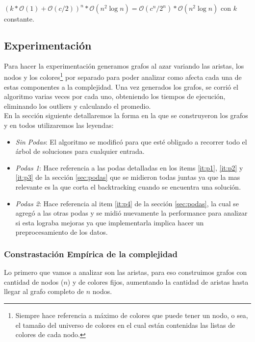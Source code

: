 \begin{center}
$(k*\mathcal{O}(1) + \mathcal{O}(c/2))^n * \mathcal{O}(n^2 \log{n}) = \mathcal{O}(c^n/2^n) * \mathcal{O}(n^2 \log{n})$ con $k$ constante.
\end{center}

\subsection{Experimentación}
Para hacer la experimentación generamos grafos al azar variando las aristas, los nodos y los colores\footnote{Siempre hace referencia a máximo de colores que puede tener un nodo, o sea, el tamaño del universo de colores en el cual están contenidas las listas de colores de cada nodo.} por separado para poder analizar como afecta cada una de estas componentes a la complejidad. Una vez generados los grafos, se corrió el algoritmo varias veces por cada uno, obteniendo los tiempos de ejecución, eliminando los outliers y calculando el promedio.\\

En la sección siguiente detallaremos la forma en la que se construyeron los grafos y en todos utilizaremos las leyendas:
\begin{itemize}
	\item \emph{Sin Podas}: El algoritmo se modificó para que esté obligado a recorrer todo el árbol de soluciones para cualquier entrada.
	
	\item \emph{Podas 1}: Hace referencia a las podas detalladas en los items \ref{it:p1}, \ref{it:p2} y \ref{it:p3} de la sección \ref{sec:podas} que se midieron todas juntas ya que la mas relevante es la que corta el backtracking cuando se encuentra una solución.

	\item \emph{Podas 2}: Hace referencia al item \ref{it:p4} de la sección \ref{sec:podas}, la cual se agregó a las otras podas y se midió nuevamente la performance para analizar si esta lograba mejoras ya que implementarla implica hacer un preprocesamiento de los datos.
\end{itemize}

\subsubsection{Constrastación Empírica de la complejidad}

Lo primero que vamos a analizar son las aristas, para eso construimos grafos con cantidad de nodos ($n$) y de colores fijos, aumentando la cantidad de aristas hasta llegar al grafo completo de $n$ nodos.

